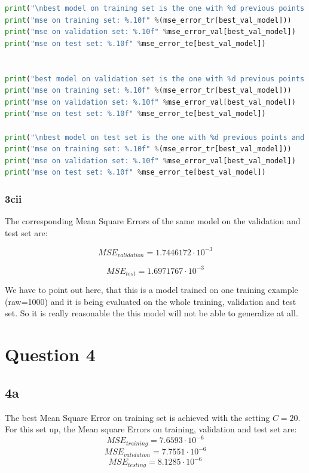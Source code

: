 \documentclass{article}
\begin{document}
\begin{lstlisting}[language=Python]
print("\nbest model on training set is the one with %d previous points and %d basis functions" %(C[best_tr_model[0]], K[best_val_model[1]]))
print("mse on training set: %.10f" %(mse_error_tr[best_val_model]))
print("mse on validation set: %.10f" %mse_error_val[best_val_model])
print("mse on test set: %.10f" %mse_error_te[best_val_model])


print("best model on validation set is the one with %d previous points and %d basis functions" %(C[best_val_model[0]], K[best_val_model[1]]))
print("mse on training set: %.10f" %(mse_error_tr[best_val_model]))
print("mse on validation set: %.10f" %mse_error_val[best_val_model])
print("mse on test set: %.10f" %mse_error_te[best_val_model])

print("\nbest model on test set is the one with %d previous points and %d basis functions" %(C[best_te_model[0]], K[best_val_model[1]]))
print("mse on training set: %.10f" %(mse_error_tr[best_val_model]))
print("mse on validation set: %.10f" %mse_error_val[best_val_model])
print("mse on test set: %.10f" %mse_error_te[best_val_model])
\end{lstlisting}


\subsubsection{3cii}

The corresponding Mean Square Errors of the same model on the validation and test set are:

$$ MSE_{validation} = 1.7446172 \cdot 10^{-3} $$

$$ MSE_{test} = 1.6971767 \cdot 10^{-3} $$

We have to point out here, that this is a model trained on one training example (raw=1000) and it is being evaluated on the whole training, validation and test set. So it is really reasonable the this model will not be able to generalize at all.


\section{Question 4}

\subsection{4a}

The best Mean Square Error on training set is achieved with the setting $C=20$. For this set up, the Mean square Errors on training, validation and test set are: 
$$MSE_{training} = 7.6593 \cdot 10^{-6}$$
$$MSE_{validation} = 7.7551 \cdot 10^{-6}$$
$$MSE_{testing} = 8.1285 \cdot 10^{-6}$$
\end{document}
